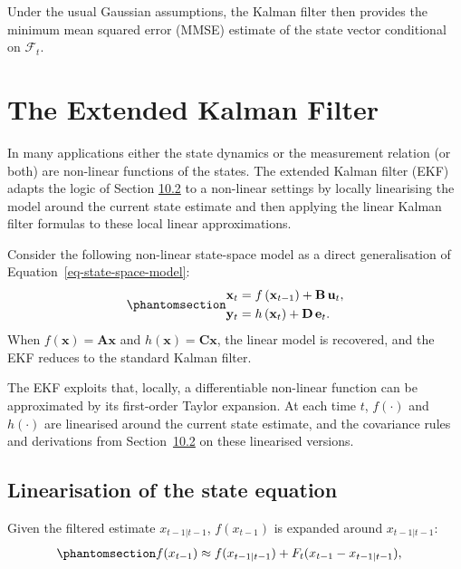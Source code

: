 \documentclass[
  letterpaper,
  DIV=11,
  numbers=noendperiod]{scrreprt}
\begin{document}
Under the usual Gaussian assumptions, the Kalman filter then provides
the minimum mean squared error (MMSE) estimate of the state vector
conditional on \(\mathcal{F}_t\).

\section{The Extended Kalman Filter}\label{sec:ekf}

In many applications either the state dynamics or the measurement
relation (or both) are non-linear functions of the states. The extended
Kalman filter (EKF) adapts the logic of Section \hyperref[sec:lkf]{10.2}
to a non-linear settings by locally linearising the model around the
current state estimate and then applying the linear Kalman filter
formulas to these local linear approximations.

Consider the following non-linear state-space model as a direct
generalisation of Equation~\ref{eq-state-space-model}:
\begin{equation}\protect\phantomsection\label{eq-gen-0130}{
\begin{align}
  \mathbf{x}_{t} &= f\left(\mathbf{x}_{t-1} \right) + \mathbf{B}\,\mathbf{u}_t, \\
  \mathbf{y}_{t} &= h\left(\mathbf{x}_{t}\right) + \mathbf{D}\,\mathbf{e}_t. 
\end{align}
}\end{equation} When \(f(\mathbf{x}) = \mathbf{A}\mathbf{x}\) and
\(h(\mathbf{x}) = \mathbf{C} \mathbf{x}\), the linear model is
recovered, and the EKF reduces to the standard Kalman filter.

The EKF exploits that, locally, a differentiable non-linear function can
be approximated by its first-order Taylor expansion. At each time \(t\),
\(f(\cdot)\) and \(h(\cdot)\) are linearised around the current state
estimate, and the covariance rules and derivations from
Section~\hyperref[sec:lkf]{10.2} on these linearised versions.

\subsection*{Linearisation of the state
equation}\label{linearisation-of-the-state-equation}

Given the filtered estimate \(x_{t-1|t-1}\), \(f(x_{t-1})\) is expanded
around \(x_{t-1|t-1}\):
\begin{equation}\protect\phantomsection\label{eq-taylor1}{
\begin{align}
f(x_{t-1}) &\approx f(x_{t-1|t-1}) + F_{t} (x_{t-1} - x_{t-1|t-1}), 
\end{align}
}\end{equation}
\end{document}
